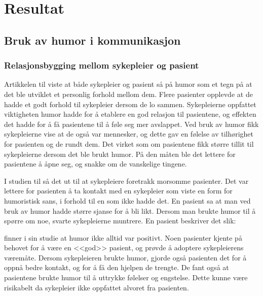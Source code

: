 \chapter{Resultat}

\section{Bruk av humor i kommunikasjon}

\subsection{Relasjonsbygging mellom sykepleier og pasient}
\label{res.relbygg}

Artikkelen til  viste at både sykepleier og pasient så på
humor som et tegn på at det ble utviklet et personlig forhold mellom dem. Flere
pasienter opplevde at de hadde et godt forhold til sykepleier dersom de lo
sammen. Sykepleierne oppfattet viktigheten humor hadde for å etablere en god
relasjon til pasientene, og effekten det hadde for å få pasientene til å føle
seg mer avslappet. Ved bruk av humor fikk sykepleierne vise at de også var
mennesker, og dette gav en følelse av tilhørighet for pasienten og de rundt
dem. Det virket som om pasientene fikk større tillit til sykepleierne dersom
det ble brukt humor. På den måten ble det lettere for pasientene å åpne seg, og
snakke om de vanskelige tingene.

I studien til  så det ut til at sykepleiere foretrakk
morsomme pasienter. Det var lettere for pasienten å ta kontakt med en
sykepleier som viste en form for humoristisk sans, i forhold til en som ikke
hadde det. En pasient sa at man ved bruk av humor hadde større sjanse for å bli
likt. Dersom man brukte humor til å spørre om noe, svarte sykepleierne
muntrere. En pasient beskriver det slik:

 finner i sin studie at humor ikke alltid var
positivt. Noen pasienter kjente på behovet for å være en <<god>> pasient, og
prøvde å adoptere sykepleierens væremåte. Dersom sykepleieren brukte humor,
gjorde også pasienten det for å oppnå bedre kontakt, og for å få den hjelpen de
trengte. De fant også at pasientene brukte humor til å uttrykke følelser og
engstelse. Dette kunne være risikabelt da sykepleier ikke oppfattet alvoret fra
pasienten.

